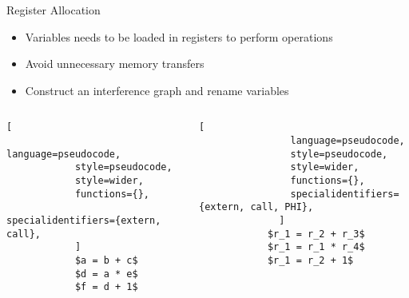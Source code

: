 
\begin{frame}[fragile]{Register Allocation}

\begin{itemize}
    \item Variables needs to be loaded in registers to perform operations
    \item Avoid unnecessary memory transfers
    \item Construct an interference graph and rename variables
\end{itemize}

\begin{columns}[c]
        \begin{lstlisting}[
            language=pseudocode,
            style=pseudocode,
            style=wider,
            functions={},
            specialidentifiers={extern, call},
            ]
			$a = b + c$
			$d = a * e$
			$f = d + 1$ 
        \end{lstlisting}
        \begin{lstlisting}[
                language=pseudocode,
                style=pseudocode,
                style=wider,
                functions={},
                specialidentifiers={extern, call, PHI},
              ]
			$r_1 = r_2 + r_3$
			$r_1 = r_1 * r_4$
			$r_1 = r_2 + 1$
        \end{lstlisting}
\end{columns}
\end{frame}


